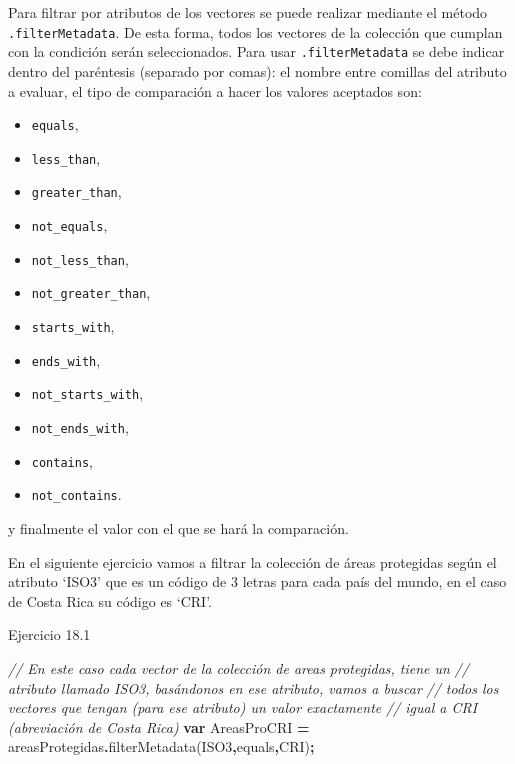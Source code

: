 \documentclass[
  12pt,
  letterpaper,
  twoside]{book}
\newenvironment{Shaded}{\begin{snugshade}}{\end{snugshade}}
\newcommand{\CommentTok}[1]{\textcolor[rgb]{0.56,0.35,0.01}{\textit{#1}}}
\newcommand{\FunctionTok}[1]{\textcolor[rgb]{0.00,0.00,0.00}{#1}}
\newcommand{\KeywordTok}[1]{\textcolor[rgb]{0.13,0.29,0.53}{\textbf{#1}}}
\newcommand{\NormalTok}[1]{#1}
\newcommand{\OperatorTok}[1]{\textcolor[rgb]{0.81,0.36,0.00}{\textbf{#1}}}
\newcommand{\StringTok}[1]{\textcolor[rgb]{0.31,0.60,0.02}{#1}}
\providecommand{\tightlist}{%
  \setlength{\itemsep}{0pt}\setlength{\parskip}{0pt}}
\begin{document}
Para filtrar por atributos de los vectores se puede realizar mediante el método \texttt{.filterMetadata}. De esta forma, todos los vectores de la colección que cumplan con la condición serán seleccionados. Para usar \texttt{.filterMetadata} se debe indicar dentro del paréntesis (separado por comas): el nombre entre comillas del atributo a evaluar, el tipo de comparación a hacer los valores aceptados son:

\begin{itemize}
\tightlist
\item
  \texttt{equals},
\item
  \texttt{less\_than},
\item
  \texttt{greater\_than},
\item
  \texttt{not\_equals},
\item
  \texttt{not\_less\_than},
\item
  \texttt{not\_greater\_than},
\item
  \texttt{starts\_with},
\item
  \texttt{ends\_with},
\item
  \texttt{not\_starts\_with},
\item
  \texttt{not\_ends\_with},
\item
  \texttt{contains},
\item
  \texttt{not\_contains}.
\end{itemize}

y finalmente el valor con el que se hará la comparación.

En el siguiente ejercicio vamos a filtrar la colección de áreas protegidas según el atributo `ISO3' que es un código de 3 letras para cada país del mundo, en el caso de Costa Rica su código es `CRI'.

Ejercicio 18.1

\begin{Shaded}
\begin{Highlighting}[]
\CommentTok{// En este caso cada vector de la colección de areas protegidas, tiene un }
\CommentTok{// atributo llamado \textquotesingle{}ISO3\textquotesingle{}, basándonos en ese atributo, vamos a buscar }
\CommentTok{// todos los vectores que tengan (para ese atributo) un valor exactamente }
\CommentTok{// igual a \textquotesingle{}CRI\textquotesingle{} (abreviación de Costa Rica)}
\KeywordTok{var}\NormalTok{ AreasProCRI }\OperatorTok{=}\NormalTok{ areasProtegidas}\OperatorTok{.}\FunctionTok{filterMetadata}\NormalTok{(}\StringTok{\textquotesingle{}ISO3\textquotesingle{}}\OperatorTok{,}\StringTok{\textquotesingle{}equals\textquotesingle{}}\OperatorTok{,}\StringTok{\textquotesingle{}CRI\textquotesingle{}}\NormalTok{)}\OperatorTok{;} 
\end{Highlighting}
\end{Shaded}
\end{document}
